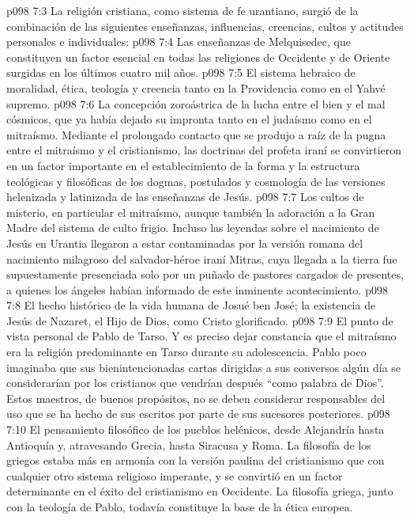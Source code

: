 \vs p098 7:3 La religión cristiana, como sistema de fe urantiano, surgió de la combinación de las siguientes enseñanzas, influencias, creencias, cultos y actitudes personales e individuales:
\vs p098 7:4 Las enseñanzas de Melquisedec, que constituyen un factor esencial en todas las religiones de Occidente y de Oriente surgidas en los últimos cuatro mil años.
\vs p098 7:5 El sistema hebraico de moralidad, ética, teología y creencia tanto en la Providencia como en el Yahvé supremo.
\vs p098 7:6 La concepción zoroástrica de la lucha entre el bien y el mal cósmicos, que ya había dejado su impronta tanto en el judaísmo como en el mitraísmo. Mediante el prolongado contacto que se produjo a raíz de la pugna entre el mitraísmo y el cristianismo, las doctrinas del profeta iraní se convirtieron en un factor importante en el establecimiento de la forma y la estructura teológicas y filosóficas de los dogmas, postulados y cosmología de las versiones helenizada y latinizada de las enseñanzas de Jesús.
\vs p098 7:7 Los cultos de misterio, en particular el mitraísmo, aunque también la adoración a la Gran Madre del sistema de culto frigio. Incluso las leyendas sobre el nacimiento de Jesús en Urantia llegaron a estar contaminadas por la versión romana del nacimiento milagroso del salvador\hyp{}héroe iraní Mitras, cuya llegada a la tierra fue supuestamente presenciada solo por un puñado de pastores cargados de presentes, a quienes los ángeles habían informado de este inminente acontecimiento.
\vs p098 7:8 El hecho histórico de la vida humana de Josué ben José; la existencia de Jesús de Nazaret, el Hijo de Dios, como Cristo glorificado.
\vs p098 7:9 El punto de vista personal de Pablo de Tarso. Y es preciso dejar constancia que el mitraísmo era la religión predominante en Tarso durante su adolescencia. Pablo poco imaginaba que sus bienintencionadas cartas dirigidas a sus conversos algún día se considerarían por los cristianos que vendrían después “como palabra de Dios”. Estos maestros, de buenos propósitos, no se deben considerar responsables del uso que se ha hecho de sus escritos por parte de sus sucesores posteriores.
\vs p098 7:10 El pensamiento filosófico de los pueblos helénicos, desde Alejandría hasta Antioquía y, atravesando Grecia, hasta Siracusa y Roma. La filosofía de los griegos estaba más en armonía con la versión paulina del cristianismo que con cualquier otro sistema religioso imperante, y se convirtió en un factor determinante en el éxito del cristianismo en Occidente. La filosofía griega, junto con la teología de Pablo, todavía constituye la base de la ética europea.
